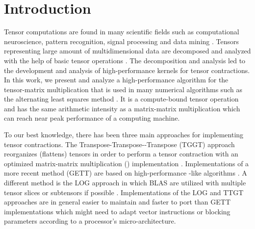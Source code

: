 \section{Introduction}
\label{sec:introduction}
Tensor computations are found in many scientific fields such as computational neuroscience, pattern recognition, signal processing and data mining \cite{karahan:2015:tensor, papalexakis:2017:tensors}.
Tensors representing large amount of multidimensional data are decomposed and analyzed with the help of basic tensor operations \cite{lee:2018:fundamental, kolda:2009:decompositions}. 
The decomposition and analysis led to the development and analysis of high-performance kernels for tensor contractions.
In this work, we present and analyze a high-performance algorithm for the tensor-matrix multiplication that is used in many numerical algorithms such as the alternating least squares method \cite{lee:2018:fundamental, kolda:2009:decompositions}.
It is a compute-bound tensor operation and has the same arithmetic intensity as a matrix-matrix multiplication which can reach near peak performance of a computing machine. 

To our best knowledge, there has been three main approaches for implementing tensor contractions.
The Transpose-Transpose--Transpose (TGGT) approach reorganizes (flattens) tensors in order to perform a tensor contraction with an optimized matrix-matrix multiplication () implementation \cite{bader:2006:algorithm862, solomonik:2013:cyclops}.
Implementations of a more recent method (GETT) are based on high-performance -like algorithms \cite{springer:2018:design, matthews:2018:high, abadi:2016:tensorflow}.
A different method is the LOG approach in which BLAS are utilized with multiple tensor slices or subtensors if possible \cite{dinapoli:2014:towards.efficient.use, li:2015:input, shi:2016:tensor.contraction}.
Implementations of the LOG and TTGT approaches are in general easier to maintain and faster to port than GETT implementations which might need to adapt vector instructions or blocking parameters according to a processor's micro-architecture.

